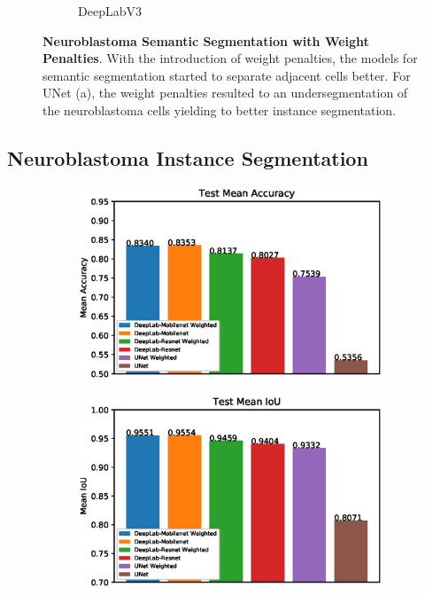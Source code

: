 \documentclass[journal]{IEEEtran}
\begin{document}
\begin{figure}
\begin{subfigure}[b]{0.45\linewidth}
\caption{DeepLabV3}
\end{subfigure}
\caption{\textbf{Neuroblastoma Semantic Segmentation with Weight Penalties}. With the introduction of weight penalties, the models for semantic segmentation started to separate adjacent cells better. For UNet (a), the weight penalties resulted to an undersegmentation of the neuroblastoma cells yielding to better instance segmentation.}
\label{fig:segmentation_with_weight_map}
\end{figure}
\subsection{Neuroblastoma Instance Segmentation}

\begin{figure}
\centering
\begin{subfigure}[b]{\linewidth}
\includegraphics[width=\linewidth]{graphs/Test-Mean-Accuracy.eps}
\end{subfigure}
\begin{subfigure}[b]{\linewidth}
\includegraphics[width=\linewidth]{graphs/Test-Mean-IoU.eps}

\end{subfigure}
\end{figure}
\end{document}
